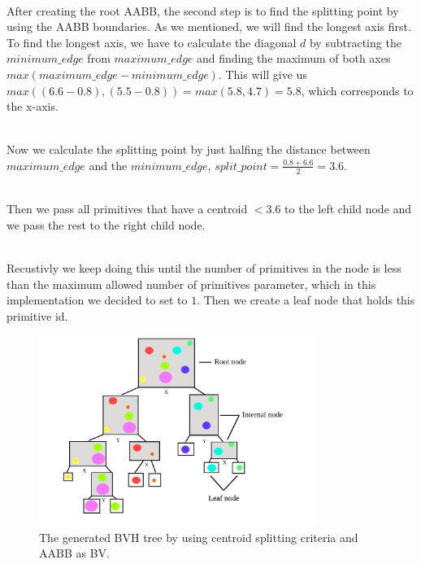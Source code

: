 \documentclass[11pt,a4paper]{article}
\begin{document}
\noindent
\\
After creating the root AABB, the second step is to find the splitting point by using the AABB boundaries. As we mentioned, we will find the longest axis first. To find the longest axis, we have to calculate the diagonal $d$ by subtracting the $minimum\_edge$ from $maximum\_edge $ and finding the maximum of both axes $max(maximum\_edge - minimum\_edge)$. This will give us $max((6.6-0.8) , (5.5-0.8)) = max(5.8,4.7) = 5.8$, which corresponds to the x-axis. 

\noindent
\\
Now we calculate the splitting point by just halfing the distance between $maximum\_edge $ and the $minimum\_edge$, $split\_point = \frac{0.8+6.6}{2} = 3.6$.

\noindent
\\
Then we pass all primitives that have a centroid $ < 3.6$ to the left child node and we pass the rest to the right child node.  

\noindent
\\
Recustivly we keep doing this until the number of primitives in the node is less than the maximum allowed number of primitives parameter, which in this implementation we decided to set to $1$. Then we create a leaf node that holds this primitive id. 


\begin{figure}[h]	
     \centering
     \captionsetup{justification=centering,margin=2cm}
     \includegraphics[width=9cm]{images/example_bvh/tree.png}
     \caption{The generated BVH tree by using centroid splitting criteria and AABB as BV.}
     \label{fig:dice}
\end{figure}
\end{document}
